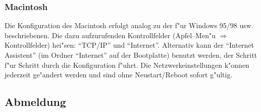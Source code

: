 \documentclass[12pt,titlepage,twoside]{scrartcl}
\newcommand{\glossar}{
\unitlength1.5mm
\begin{picture}(2,2)
\put(0,0){\vector(2,1){2.5}}
\end{picture}
}
\begin{document}


\subsubsection{Macintosh}
Die Konfiguration des Macintosh erfolgt analog zu der f"ur Windows 95/98
usw. beschriebenen. Die dazu aufzurufenden Kontrollfelder (Apfel--Men"u
$\Rightarrow$ Kontrollfelder) hei"sen:
"`TCP/IP"' und "`Internet"'. Alternativ kann der "`Internet Assistent"' (im
Ordner "`Internet"' auf der Bootplatte) benutzt werden, der Schritt f"ur
Schritt durch die Konfiguration f"uhrt. Die Netzwerkeinstellungen k"onnen
jederzeit ge"andert werden und sind ohne Neustart/Reboot sofort g"ultig.

\subsection{Abmeldung}
\end{document}
